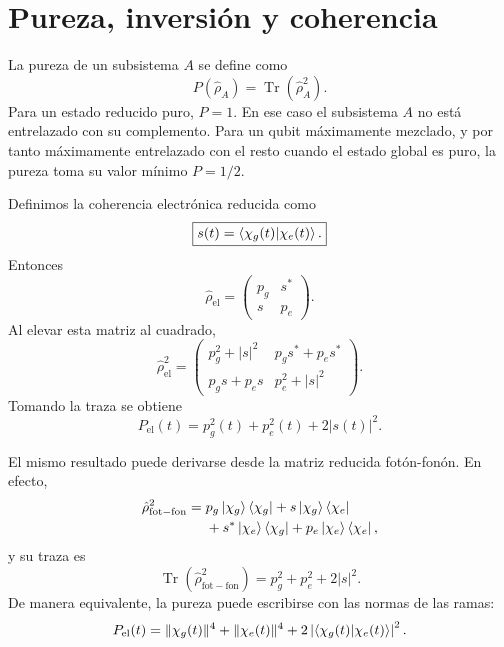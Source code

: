 \documentclass[11pt]{article}
\begin{document}
\section{Pureza, inversi\'on y coherencia}

La pureza de un subsistema $A$ se define como
\begin{equation}
  P(\hat\rho_A)
  =
  \operatorname{Tr}(\hat\rho_A^2).
\end{equation}
Para un estado reducido puro, $P=1$. En ese caso el subsistema $A$ no est\'a
entrelazado con su complemento. Para un qubit m\'aximamente mezclado, y por
tanto m\'aximamente entrelazado con el resto cuando el estado global es puro,
la pureza toma su valor m\'inimo $P=1/2$.

Definimos la coherencia electr\'onica reducida como
\begin{equation}
  \boxed{
  s(t)=\braket{\chi_g(t)|\chi_e(t)}.
  }
\end{equation}
Entonces
\begin{equation}
  \hat\rho_{\mathrm{el}}
  =
  \begin{pmatrix}
    p_g & s^*\\
    s & p_e
  \end{pmatrix}.
\end{equation}
Al elevar esta matriz al cuadrado,
\begin{equation}
  \hat\rho_{\mathrm{el}}^2
  =
  \begin{pmatrix}
    p_g^2+|s|^2 & p_gs^*+p_es^*
    \\
    p_gs+p_es & p_e^2+|s|^2
  \end{pmatrix}.
\end{equation}
Tomando la traza se obtiene
\begin{equation}
  P_{\mathrm{el}}(t)
  =
  p_g^2(t)+p_e^2(t)+2|s(t)|^2.
\end{equation}

El mismo resultado puede derivarse desde la matriz reducida fot\'on-fon\'on.
En efecto,
\begin{equation}
\begin{aligned}
  \hat\rho_{\mathrm{fot-fon}}^2
  ={}&
  p_g\ket{\chi_g}\bra{\chi_g}
  +s\ket{\chi_g}\bra{\chi_e}
  \\
  &+s^*\ket{\chi_e}\bra{\chi_g}
  +p_e\ket{\chi_e}\bra{\chi_e},
\end{aligned}
\end{equation}
y su traza es
\begin{equation}
  \operatorname{Tr}(\hat\rho_{\mathrm{fot-fon}}^2)
  =
  p_g^2+p_e^2+2|s|^2.
\end{equation}
De manera equivalente, la pureza puede escribirse con las normas de las ramas:
\begin{equation}
  P_{\mathrm{el}}(t)
  =
  \|\chi_g(t)\|^4
  +
  \|\chi_e(t)\|^4
  +
  2\left|\braket{\chi_g(t)|\chi_e(t)}\right|^2.
\end{equation}
\end{document}
